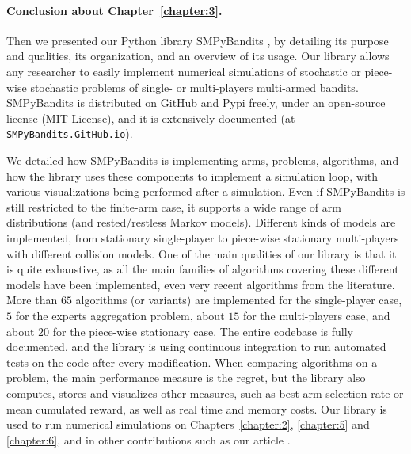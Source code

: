 \paragraph{Conclusion about \textbf{Chapter~\ref{chapter:3}}.}

Then we presented our Python library SMPyBandits \cite{SMPyBanditsJMLR,SMPyBandits}, by detailing
its purpose and qualities, its organization, and an overview of its usage.
%
Our library allows any researcher to easily implement numerical simulations of stochastic or piece-wise stochastic problems of single- or multi-players multi-armed bandits.
SMPyBandits is distributed on GitHub and Pypi freely, under an open-source license (MIT License), and it is extensively documented (at \href{https://SMPyBandits.GitHub.io}{\texttt{SMPyBandits.GitHub.io}}).

We detailed how SMPyBandits is implementing arms, problems, algorithms, and how the library uses these components to implement a simulation loop, with various visualizations being performed after a simulation.
Even if SMPyBandits is still restricted to the finite-arm case, it supports a wide range of arm distributions (and rested/restless Markov models).
Different kinds of models are implemented, from stationary single-player to piece-wise stationary multi-players with different collision models.
One of the main qualities of our library is that it is quite exhaustive, as all the main families of algorithms covering these different models have been implemented, even very recent algorithms from the literature.
More than $65$ algorithms (or variants) are implemented for the single-player case, $5$ for the experts aggregation problem, about $15$ for the multi-players case, and about $20$ for the piece-wise stationary case.
The entire codebase is fully documented, and the library is using continuous integration to run automated tests on the code after every modification.
%
When comparing algorithms on a problem, the main performance measure is the regret, but the library also computes, stores and visualizes other measures, such as best-arm selection rate or mean cumulated reward, as well as real time and memory costs.
%
Our library is used to run numerical simulations on Chapters~\ref{chapter:2}, \ref{chapter:5} and \ref{chapter:6}, and in other contributions such as our article \cite{Besson2018DoublingTricks}.


